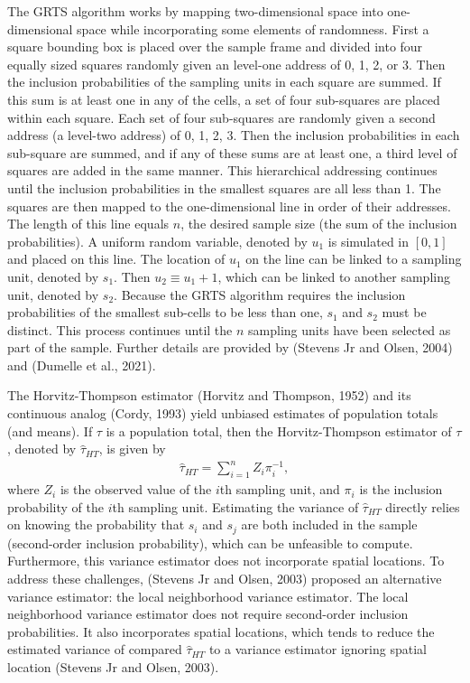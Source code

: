 \documentclass[]{elsarticle} %
\begin{document}
The GRTS algorithm works by mapping two-dimensional space into
one-dimensional space while incorporating some elements of randomness.
First a square bounding box is placed over the sample frame and divided
into four equally sized squares randomly given an level-one address of
0, 1, 2, or 3. Then the inclusion probabilities of the sampling units in
each square are summed. If this sum is at least one in any of the cells,
a set of four sub-squares are placed within each square. Each set of
four sub-squares are randomly given a second address (a level-two
address) of 0, 1, 2, 3. Then the inclusion probabilities in each
sub-square are summed, and if any of these sums are at least one, a
third level of squares are added in the same manner. This hierarchical
addressing continues until the inclusion probabilities in the smallest
squares are all less than 1. The squares are then mapped to the
one-dimensional line in order of their addresses. The length of this
line equals \(n\), the desired sample size (the sum of the inclusion
probabilities). A uniform random variable, denoted by \(u_1\) is
simulated in \([0, 1]\) and placed on this line. The location of \(u_1\)
on the line can be linked to a sampling unit, denoted by \(s_1\). Then
\(u_2 \equiv u_1 + 1\), which can be linked to another sampling unit,
denoted by \(s_2\). Because the GRTS algorithm requires the inclusion
probabilities of the smallest sub-cells to be less than one, \(s_1\) and
\(s_2\) must be distinct. This process continues until the \(n\)
sampling units have been selected as part of the sample. Further details
are provided by (Stevens Jr and Olsen, 2004) and (Dumelle et al., 2021).

The Horvitz-Thompson estimator (Horvitz and Thompson, 1952) and its
continuous analog (Cordy, 1993) yield unbiased estimates of population
totals (and means). If \(\tau\) is a population total, then the
Horvitz-Thompson estimator of \(\tau\), denoted by \(\hat{\tau}_{HT}\),
is given by \begin{align}\label{eq:htest}
  \hat{\tau}_{HT} = \sum_{i = 1}^n Z_i \pi_i^{-1},
\end{align} where \(Z_i\) is the observed value of the \(i\)th sampling
unit, and \(\pi_i\) is the inclusion probability of the \(i\)th sampling
unit. Estimating the variance of \(\hat{\tau}_{HT}\) directly relies on
knowing the probability that \(s_i\) and \(s_j\) are both included in
the sample (second-order inclusion probability), which can be unfeasible
to compute. Furthermore, this variance estimator does not incorporate
spatial locations. To address these challenges, (Stevens Jr and Olsen,
2003) proposed an alternative variance estimator: the local neighborhood
variance estimator. The local neighborhood variance estimator does not
require second-order inclusion probabilities. It also incorporates
spatial locations, which tends to reduce the estimated variance of
compared \(\hat{\tau}_{HT}\) to a variance estimator ignoring spatial
location (Stevens Jr and Olsen, 2003).
\end{document}

